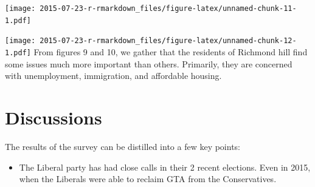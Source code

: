 \documentclass[
]{article}
\newenvironment{Shaded}{\begin{snugshade}}{\end{snugshade}}
\newcommand{\CommentTok}[1]{\textcolor[rgb]{0.56,0.35,0.01}{\textit{#1}}}
\newcommand{\DataTypeTok}[1]{\textcolor[rgb]{0.13,0.29,0.53}{#1}}
\newcommand{\KeywordTok}[1]{\textcolor[rgb]{0.13,0.29,0.53}{\textbf{#1}}}
\newcommand{\NormalTok}[1]{#1}
\newcommand{\OperatorTok}[1]{\textcolor[rgb]{0.81,0.36,0.00}{\textbf{#1}}}
\newcommand{\StringTok}[1]{\textcolor[rgb]{0.31,0.60,0.02}{#1}}
\providecommand{\tightlist}{%
  \setlength{\itemsep}{0pt}\setlength{\parskip}{0pt}}
\begin{document}
\texttt{[image: 2015-07-23-r-rmarkdown\_files/figure-latex/unnamed-chunk-11-1.pdf]}

\begin{Shaded}
\end{Shaded}

\texttt{[image: 2015-07-23-r-rmarkdown\_files/figure-latex/unnamed-chunk-12-1.pdf]}
From figures 9 and 10, we gather that the residents of Richmond hill
find some issues much more important than others. Primarily, they are
concerned with unemployment, immigration, and affordable housing.

\hypertarget{discussions}{%
\section{Discussions}\label{discussions}}

The results of the survey can be distilled into a few key points:

\begin{itemize}
\tightlist
\item
  The Liberal party has had close calls in their 2 recent elections.
  Even in 2015, when the Liberals were able to reclaim GTA from the
  Conservatives.
\end{itemize}
\end{document}
